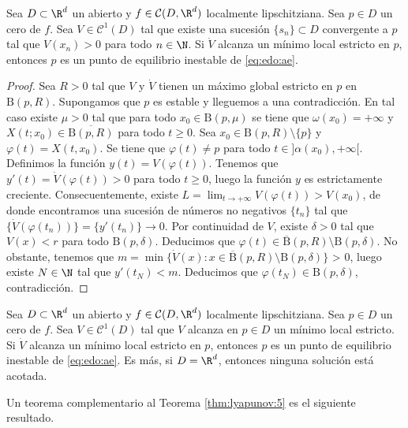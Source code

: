 \begin{theorem} 
  \label{thm:lyapunov:5}
  Sea $D \subset \R^d$ un abierto y $f \in \mathcal{C}(D, \R^d)$ localmente lipschitziana. Sea
  $p \in D$ un cero de $f$.  Sea $V \in \mathcal{C}^1(D)$ tal que existe una sucesión
  $\{s_n\} \subset D$ convergente a $p$ tal que $V(x_n) > 0$ para todo $n \in \N$. Si $\dot{V}$
  alcanza un mínimo local estricto en $p$, entonces $p$ es un punto de equilibrio inestable de
  \eqref{eq:edo:ae}.
\end{theorem}
\begin{proof}
  Sea $R > 0$ tal que $V$ y $\dot{V}$ tienen un máximo global estricto en $p$ en
  $\mathrm{B}(p,R)$. Supongamos que $p$ es estable y lleguemos a una contradicción. En tal caso
  existe $\mu > 0$ tal que para todo $x_0 \in \mathrm{B}(p,\mu)$ se tiene que
  $\omega(x_0) = +\infty$ y $X(t;x_0) \in \overline{\mathrm{B}(p,R)}$ para todo $t \ge 0$. Sea
  $x_0 \in \mathrm{B}(p,R) \setminus \{p\}$ y $\varphi(t) = X(t, x_0)$. Se tiene que
  $\varphi(t) \ne p$ para todo $t \in ]\alpha(x_0),+\infty[$.  Definimos la función
  $y(t) = V(\varphi(t))$. Tenemos que $y'(t) = \dot{V}(\varphi(t)) > 0$ para todo $t \ge 0$, luego
  la función $y$ es estrictamente creciente. Consecuentemente, existe
  $L = \lim_{t \to +\infty} V(\varphi(t)) > V(x_0)$, de donde encontramos una sucesión de números no
  negativos $\{t_n\}$ tal que $\{\dot{V}(\varphi(t_n))\} = \{y'(t_n)\} \to 0$. Por continuidad de
  $V$, existe $\delta >0$ tal que $V(x) < r$ para todo $\mathrm{B}(p,\delta)$. Deducimos que
  $\varphi(t) \in \overline{\mathrm{B}}(p, R) \setminus \mathrm{B}(p, \delta)$. No obstante, tenemos
  que $m = \min \{\dot{V}(x) : x \in \overline{\mathrm{B}}(p,R) \setminus \mathrm{B}(p,\delta)\}$ >
  0, luego existe $N \in \N$ tal que $y'(t_N) < m$. Deducimos que
  $\varphi(t_N) \in \mathrm{B}(p,\delta)$, contradicción.
\end{proof}

\begin{corollary}
  Sea $D \subset \R^d$ un abierto y $f \in \mathcal{C}(D, \R^d)$ localmente lipschitziana. Sea
  $p \in D$ un cero de $f$.  Sea $V \in \mathcal{C}^1(D)$ tal que $V$ alcanza en $p \in D$ un mínimo
  local estricto. Si $\dot{V}$ alcanza un mínimo local estricto en $p$, entonces $p$ es un punto de
  equilibrio inestable de \eqref{eq:edo:ae}. Es más, si $D = \R^d$, entonces ninguna solución está
  acotada.
\end{corollary}

Un teorema complementario al Teorema \ref{thm:lyapunov:5} es el siguiente resultado.

